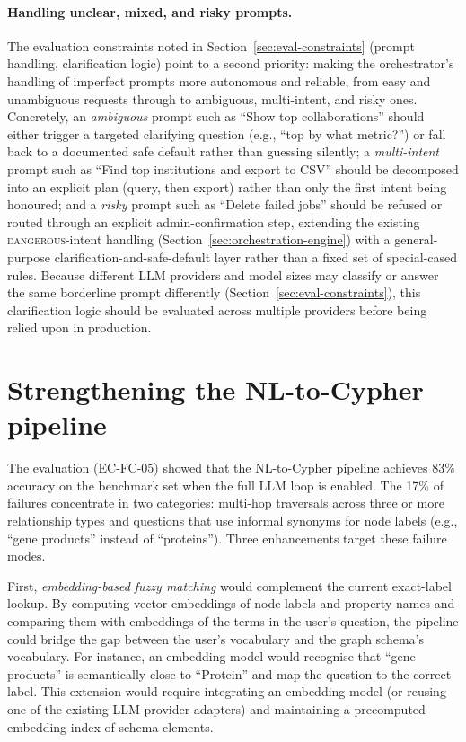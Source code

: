 \documentclass[a4paper,noexaminfo]{sapthesis}
\begin{document}
\paragraph{Handling unclear, mixed, and risky prompts.}
The evaluation constraints noted in Section~\ref{sec:eval-constraints}
(prompt handling, clarification logic) point to a second priority: making
the orchestrator's handling of imperfect prompts more autonomous and
reliable, from easy and unambiguous requests through to ambiguous,
multi-intent, and risky ones.  Concretely, an \emph{ambiguous} prompt
such as ``Show top collaborations'' should either trigger a targeted
clarifying question (e.g., ``top by what metric?'') or fall back to a
documented safe default rather than guessing silently; a
\emph{multi-intent} prompt such as ``Find top institutions and export to
CSV'' should be decomposed into an explicit plan (query, then export)
rather than only the first intent being honoured; and a \emph{risky}
prompt such as ``Delete failed jobs'' should be refused or routed through
an explicit admin-confirmation step, extending the existing
\textsc{dangerous}-intent handling
(Section~\ref{sec:orchestration-engine}) with a general-purpose
clarification-and-safe-default layer rather than a fixed set of
special-cased rules.  Because different LLM providers and model sizes
may classify or answer the same borderline prompt differently
(Section~\ref{sec:eval-constraints}), this clarification logic should be
evaluated across multiple providers before being relied upon in
production.

\section{Strengthening the NL-to-Cypher pipeline}
\label{sec:fw-nl-cypher}

The evaluation (EC-FC-05) showed that the NL-to-Cypher pipeline achieves
83\% accuracy on the benchmark set when the full LLM loop is enabled.
The 17\% of failures concentrate in two categories: multi-hop traversals
across three or more relationship types and questions that use informal
synonyms for node labels (e.g., ``gene products'' instead of
``proteins'').  Three enhancements target these failure modes.

First, \emph{embedding-based fuzzy matching} would complement the current
exact-label lookup.  By computing vector embeddings of node labels and
property names and comparing them with embeddings of the terms in the
user's question, the pipeline could bridge the gap between the user's
vocabulary and the graph schema's vocabulary.  For instance, an embedding
model would recognise that ``gene products'' is semantically close to
``Protein'' and map the question to the correct label.  This extension
would require integrating an embedding model (or reusing one of the
existing LLM provider adapters) and maintaining a precomputed embedding
index of schema elements.
\end{document}
